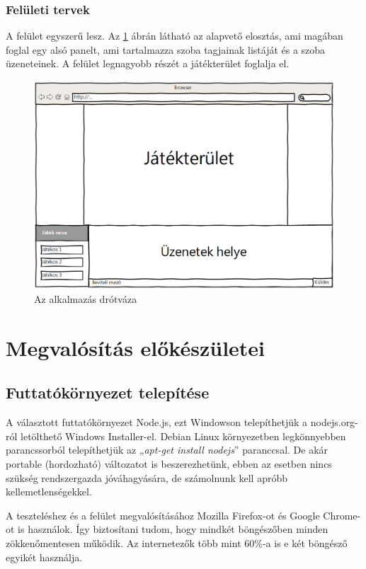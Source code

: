 \documentclass[bibliography=totocnumbered]{article}
\begin{document}
\subsubsection{Felületi tervek}

A felület egyszerű lesz. Az \ref{vaz} ábrán látható az alapvető elosztás, ami
magában foglal egy alsó panelt, ami tartalmazza szoba tagjainak listáját
és a szoba üzeneteinek. A felület legnagyobb részét a játékterület
foglalja el.

\begin{figure}[ht]
	\caption{Az alkalmazás drótváza}
	\label{vaz}
	\includegraphics[scale=0.42]{media/image1.png}
\end{figure}

\section{Megvalósítás
előkészületei}


\subsection{Futtatókörnyezet
telepítése}

A választott futtatókörnyezet Node.js, ezt Windowson telepíthetjük a
nodejs.org-ról letölthető Windows Installer-el. Debian Linux
környezetben legkönnyebben parancssorból telepíthetjük az „\emph{apt-get
install nodejs}'' paranccsal. De akár portable (hordozható) változatot
is beszerezhetünk, ebben az esetben nincs szükség rendszergazda
jóváhagyására, de számolnunk kell apróbb kellemetlenségekkel.

A teszteléshez és a felület megvalósításához Mozilla Firefox-ot és
Google Chrome-ot is használok. Így biztosítani tudom, hogy mindkét
böngészőben minden zökkenőmentesen működik. Az internetezők több mint
60\%-a is e két böngésző egyikét használja.
\end{document}

